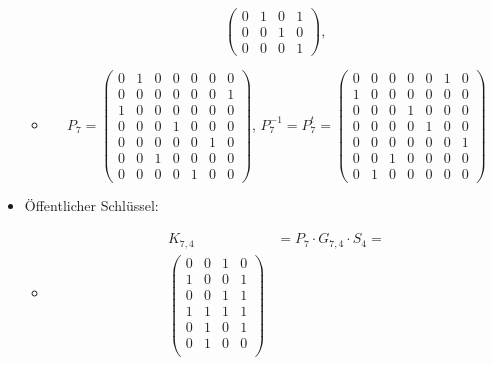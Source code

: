 \begin{itemize}
\begin{itemize}
\[\begin{pmatrix}
                0 & 1 & 0 & 1\\
                0 & 0 & 1 & 0\\
                0 & 0 & 0 & 1
            \end{pmatrix},\,
        \]
        \item[]
        \[
            P_7=
            \begin{pmatrix}
                0 & 1 & 0 & 0 & 0 & 0 & 0\\
                0 & 0 & 0 & 0 & 0 & 0 & 1\\
                1 & 0 & 0 & 0 & 0 & 0 & 0\\
                0 & 0 & 0 & 1 & 0 & 0 & 0\\
                0 & 0 & 0 & 0 & 0 & 1 & 0\\
                0 & 0 & 1 & 0 & 0 & 0 & 0\\
                0 & 0 & 0 & 0 & 1 & 0 & 0
            \end{pmatrix}
        ,\,
            P_7^{-1}=P_7^t=
            \begin{pmatrix}
                0 & 0 & 0 & 0 & 0 & 1 & 0\\
                1 & 0 & 0 & 0 & 0 & 0 & 0\\
                0 & 0 & 0 & 1 & 0 & 0 & 0\\
                0 & 0 & 0 & 0 & 1 & 0 & 0\\
                0 & 0 & 0 & 0 & 0 & 0 & 1\\
                0 & 0 & 1 & 0 & 0 & 0 & 0\\
                0 & 1 & 0 & 0 & 0 & 0 & 0
            \end{pmatrix}
        \]
    \end{itemize}
    \item Öffentlicher Schlüssel:
    \begin{itemize}
        \item[]
        \begin{align*}
            K_{7,4}&=P_{7}\cdot G_{7,4}\cdot S_{4}=\\
            \begin{pmatrix} %
                0 & 0 & 1 & 0\\
                1 & 0 & 0 & 1\\
                0 & 0 & 1 & 1\\
                1 & 1 & 1 & 1\\
                0 & 1 & 0 & 1\\
                0 & 1 & 0 & 0\\

\end{pmatrix}
\end{align*}
\end{itemize}
\end{itemize}

